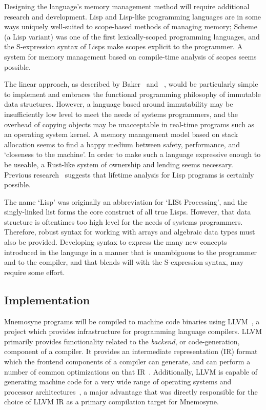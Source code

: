 \documentclass[11pt]{article}
\theoremstyle{break}
\begin{document}
Designing the language's memory management method will require additional research and development. Lisp and Lisp-like programming languages are in some ways uniquely well-suited to scope-based methods of managing memory; Scheme~\cite{r6rs} (a Lisp variant) was one of the first lexically-scoped programming languages, and the S-expression syntax of Lisps make scopes explicit to the programmer. A system for memory management based on compile-time analysis of scopes seems possible.

The linear approach, as described by Baker~\cite{Baker:1992:LLL:142137.142162,Baker:1995:UVL:199818.199860} and \citeauthor{hawblitzel2004low}~\cite{hawblitzel2004low}, would be particularly simple to implement and embraces the functional programming philosophy of immutable data structures. However, a language based around immutability may be insufficiently low level to meet the needs of systems programmers, and the overhead of copying objects may be unacceptable in real-time programs such as an operating system kernel. A memory management model based on stack allocation seems to find a happy medium between safety, performance, and `closeness to the machine'. In order to make such a language expressive enough to be useable, a Rust-like system of ownership and lending seems necessary. Previous research~\cite{sobalvarro1988lifetime} suggests that lifetime analysis for Lisp programs is certainly possible.

The name `Lisp' was originally an abbreviation for `LISt Processing', and the singly-linked list forms the core construct of all true Lisps. However, that data structure is oftentimes too high level for the needs of systems programmers. Therefore, robust syntax for working with arrays and algebraic data types must also be provided. Developing syntax to express the many new concepts introduced in the language in a manner that is unambiguous to the programmer and to the compiler, and that blends will with the S-expression syntax, may require some effort.

\subsection{Implementation}

Mnemosyne programs will be compiled to machine code binaries using LLVM~\cite{Lattner:2004:LCF:977395.977673}, a project which provides infrastructure for programming language compilers. LLVM primarily provides functionality related to the \textit{backend}, or code-generation, component of a compiler. It provides an intermediate representation (IR) format which the frontend components of a compiler can generate, and can perform a number of common optimizations on that IR~\cite{Lattner:2004:LCF:977395.977673,Terei:2010:LBG:1863523.1863538}. Additionally, LLVM is capable of generating machine code for a very wide range of operating systems and processor architectures~\cite{Lattner:2004:LCF:977395.977673,Terei:2010:LBG:1863523.1863538}, a major advantage that was directly responsible for the choice of LLVM IR as a primary compilation target for Mnemosyne.
\end{document}
